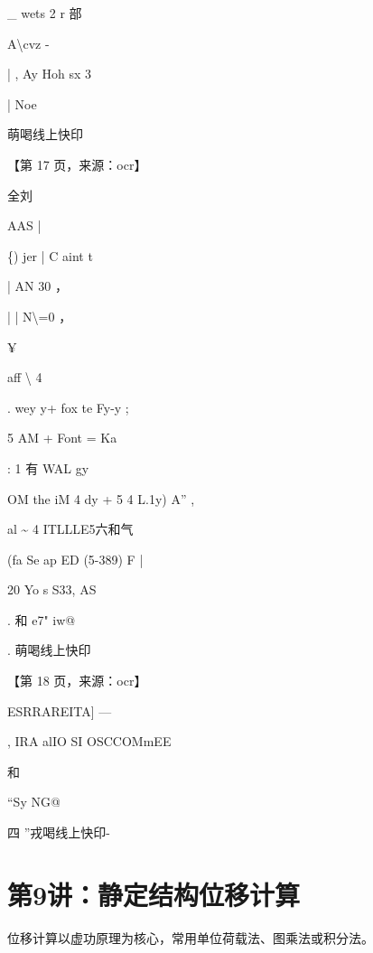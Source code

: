 \documentclass[UTF8,12pt,a4paper,openany]{ctexbook}
\begin{document}
\begin{enumerate}[label=\textbf{\arabic*.},leftmargin=2em]
\_ wets 2   r       部\par A\textbackslash{}cvz                     -\par |                                  ,   Ay Hoh sx                 3\par |                                                      Noe\par 萌喝线上快印\par \par 【第 17 页，来源：ocr】\par 全刘\par AAS                          |\par \{)      jer | C              aint t\par |                 AN 30          ，\par |           |                   N\textbackslash{}=0                  ，\par ¥\par aff      \textbackslash{}          4\par .      wey       y+ fox te Fy-y         ;\par 5   AM +  Font =   Ka\par :     1 有 WAL gy\par OM the   iM 4 dy +      5 4         L.1y)   A”        ,\par al             \textasciitilde{}  4   ITLLLE5六和气\par (fa Se ap ED (5-389) F    |\par 20 Yo          s                         S33, AS\par .         和                                    e7" iw@\par .                             萌喝线上快印\par \par 【第 18 页，来源：ocr】\par ESRRAREITA] —\par , IRA alIO SI OSCCOMmEE\par 和\par “Sy NG@\par 四    ”戎喝线上快印-
\end{enumerate}
\chapter{第9讲：静定结构位移计算}
\begin{tcolorbox}[title=解析总览]
位移计算以虚功原理为核心，常用单位荷载法、图乘法或积分法。
\end{tcolorbox}
\end{document}
